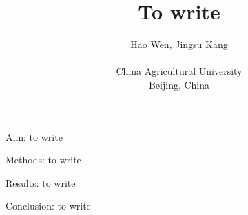 \documentclass{cinc-abstract}
\newcommand\wordcount{ \currfilepath"}}
\begin{document}
\title{To write}

\author {Hao Wen, Jingsu Kang\\ %
\ \\ %
China Agricultural University\\  %
Beijing, China} %

\maketitle



Aim: to write

Methods: to write

Results: to write

Conclusion: to write


\end{document}
